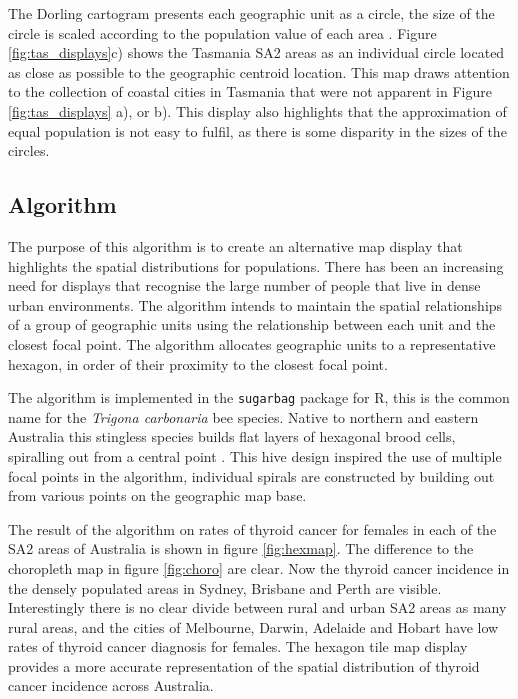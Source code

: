 The Dorling cartogram presents each geographic unit as a circle, the
size of the circle is scaled according to the population value of each
area \citep{ACTUC}. Figure \ref{fig:tas_displays}c) shows the Tasmania
SA2 areas as an individual circle located as close as possible to the
geographic centroid location. This map draws attention to the collection
of coastal cities in Tasmania that were not apparent in Figure
\ref{fig:tas_displays} a), or b). This display also highlights that the
approximation of equal population is not easy to fulfil, as there is
some disparity in the sizes of the circles.

\hypertarget{algorithm}{%
\subsection{Algorithm}\label{algorithm}}

The purpose of this algorithm is to create an alternative map display
that highlights the spatial distributions for populations. There has
been an increasing need for displays that recognise the large number of
people that live in dense urban environments. The algorithm intends to
maintain the spatial relationships of a group of geographic units using
the relationship between each unit and the closest focal point. The
algorithm allocates geographic units to a representative hexagon, in
order of their proximity to the closest focal point.

The algorithm is implemented in the \texttt{sugarbag} package for R,
this is the common name for the \emph{Trigona carbonaria} bee species.
Native to northern and eastern Australia this stingless species builds
flat layers of hexagonal brood cells, spiralling out from a central
point \citep{PH}. This hive design inspired the use of multiple focal
points in the algorithm, individual spirals are constructed by building
out from various points on the geographic map base.

The result of the algorithm on rates of thyroid cancer for females in
each of the SA2 areas of Australia is shown in figure \ref{fig:hexmap}.
The difference to the choropleth map in figure \ref{fig:choro} are
clear. Now the thyroid cancer incidence in the densely populated areas
in Sydney, Brisbane and Perth are visible. Interestingly there is no
clear divide between rural and urban SA2 areas as many rural areas, and
the cities of Melbourne, Darwin, Adelaide and Hobart have low rates of
thyroid cancer diagnosis for females. The hexagon tile map display
provides a more accurate representation of the spatial distribution of
thyroid cancer incidence across Australia.

